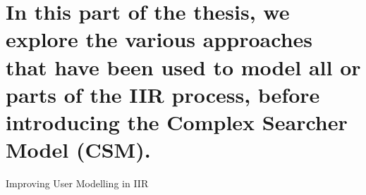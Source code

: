 
\part[Improving User Modelling in IIR]{In this part of the thesis, we explore the various approaches that have been used to model all or parts of the IIR process, before introducing the Complex Searcher Model (CSM).}{Improving User Modelling in IIR}
\label{part:modelling}